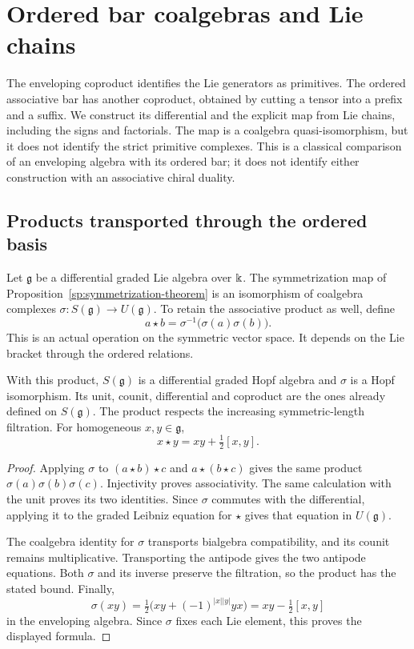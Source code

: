 \section{Ordered bar coalgebras and Lie chains}
\label{chap:ordered-lie-bar}

The enveloping coproduct identifies the Lie generators as primitives.
The ordered associative bar has another coproduct, obtained by cutting
a tensor into a prefix and a suffix. We construct its differential and
the explicit map from Lie chains, including the signs and factorials.
The map is a coalgebra quasi-isomorphism, but it does not identify the
strict primitive complexes. This is a classical comparison of an
enveloping algebra with its ordered bar; it does not identify either
construction with an associative chiral duality.

\subsection{Products transported through the ordered basis}
\label{sec:olb-transported-product}

Let $\mathfrak g$ be a differential graded Lie algebra over $\Bbbk$.
The symmetrization map of
Proposition~\ref{sp:symmetrization-theorem} is an isomorphism of
coalgebra complexes
$\sigma:S(\mathfrak g)\to U(\mathfrak g)$.
To retain the associative product as well, define
\begin{equation}
 a\star b=\sigma^{-1}\bigl(\sigma(a)\sigma(b)\bigr).
 \label{eq:olb-transported-product}
\end{equation}
This is an actual operation on the symmetric vector space.
It depends on the Lie bracket through the ordered relations.

\begin{proposition}\label{prop:olb-transported-product}
With this product, $S(\mathfrak g)$ is a differential graded Hopf
algebra and $\sigma$ is a Hopf isomorphism.
Its unit, counit, differential and coproduct are the ones already
defined on $S(\mathfrak g)$.
The product respects the increasing symmetric-length filtration.
For homogeneous $x,y\in\mathfrak g$,
\[
 x\star y=xy+\tfrac12[x,y].
\]
\end{proposition}

\begin{proof}
Applying $\sigma$ to $(a\star b)\star c$ and $a\star(b\star c)$
gives the same product $\sigma(a)\sigma(b)\sigma(c)$.
Injectivity proves associativity.  The same calculation with the
unit proves its two identities.
Since $\sigma$ commutes with the differential, applying it to the
graded Leibniz equation for $\star$ gives that equation in
$U(\mathfrak g)$.

The coalgebra identity for $\sigma$ transports bialgebra
compatibility, and its counit remains multiplicative.
Transporting the antipode gives the two antipode equations.
Both $\sigma$ and its inverse preserve the filtration, so the
product has the stated bound.
Finally,
\[
 \sigma(xy)=\tfrac12\bigl(xy+(-1)^{|x||y|}yx\bigr)
            =xy-\tfrac12[x,y]
\]
in the enveloping algebra.  Since $\sigma$ fixes each Lie element,
this proves the displayed formula.
\end{proof}

